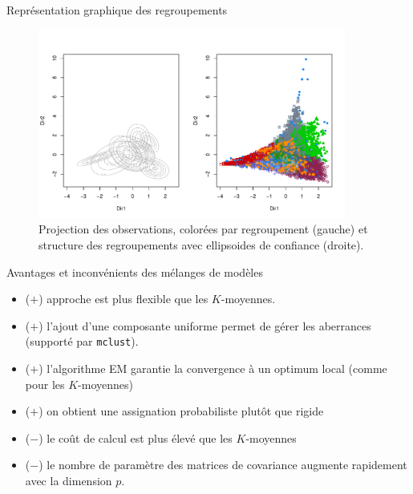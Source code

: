 \documentclass[
  ignorenonframetext,
]{beamer}
\providecommand{\tightlist}{%
  \setlength{\itemsep}{0pt}\setlength{\parskip}{0pt}}\usepackage{longtable,booktabs,array}
\begin{document}
\begin{frame}{Représentation graphique des regroupements}
\protect\hypertarget{repruxe9sentation-graphique-des-regroupements}{}
\begin{figure}

{\centering \includegraphics[width=0.9\textwidth,height=\textheight]{MATH60602-diapos12_files/figure-beamer/fig-classifreducmclust-1.pdf}

}

\caption{\label{fig-classifreducmclust}Projection des observations,
colorées par regroupement (gauche) et structure des regroupements avec
ellipsoides de confiance (droite).}

\end{figure}
\end{frame}

\begin{frame}[fragile]{Avantages et inconvénients des mélanges de
modèles}
\protect\hypertarget{avantages-et-inconvuxe9nients-des-muxe9langes-de-moduxe8les}{}
\begin{itemize}
\tightlist
\item
  (\(+\)) approche est plus flexible que les \(K\)-moyennes.
\item
  (\(+\)) l'ajout d'une composante uniforme permet de gérer les
  aberrances (supporté par \texttt{mclust}).
\item
  (\(+\)) l'algorithme EM garantie la convergence à un optimum local
  (comme pour les \(K\)-moyennes)
\item
  (\(+\)) on obtient une assignation probabiliste plutôt que rigide
\item
  (\(-\)) le coût de calcul est plus élevé que les \(K\)-moyennes
\item
  (\(-\)) le nombre de paramètre des matrices de covariance augmente
  rapidement avec la dimension \(p\).
\end{itemize}
\end{frame}
\end{document}
